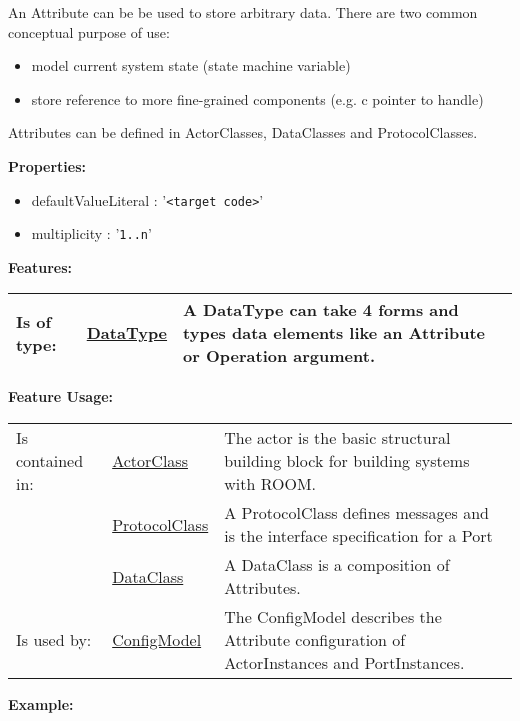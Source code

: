 	An Attribute can be be used to store arbitrary data. There are two common conceptual purpose of use:
	
	\begin{itemize}
		\item model current system state (state machine variable)
		\item store reference to more fine-grained components (e.g. c pointer to handle)
	\end{itemize}
	Attributes can be defined in ActorClasses, DataClasses and ProtocolClasses.
		
	\textbf{Properties:}
	\begin{itemize}
	\item defaultValueLiteral : '\verb|<target code>|'
	\item multiplicity : '\verb|1..n|'
	\end{itemize}
		
	\begingroup
	\textbf{Features:}
	\renewcommand{\arraystretch}{1.8} %
	\begin{longtable}{l|l p{}}
		\hline
	Is of type: & \tabitem \hyperlink{ref:DataType}{DataType}  & A DataType can take 4 forms and types data elements like an Attribute or Operation argument.\\
	\hline
	\end{longtable}
	\endgroup
		
	\begingroup
	\textbf{Feature Usage:}
	\renewcommand{\arraystretch}{1.8} %
	\begin{longtable}{l|l p{}}
		\hline
	Is contained in: & \tabitem \hyperlink{ref:ActorClass}{ActorClass}  & The actor is the basic structural building block for building systems with ROOM.\\
	& \tabitem \hyperlink{ref:ProtocolClass}{ProtocolClass}  & A ProtocolClass defines messages and is the interface specification for a Port \\
	& \tabitem \hyperlink{ref:DataClass}{DataClass}  & A DataClass is a composition of Attributes. \\
	\hline
	Is used by: & \tabitem \hyperlink{ref:ConfigModel}{ConfigModel}  & The ConfigModel describes the Attribute configuration of ActorInstances and PortInstances. \\
	\hline
	\end{longtable}
	\endgroup
		
	\textbf{Example:}
	
